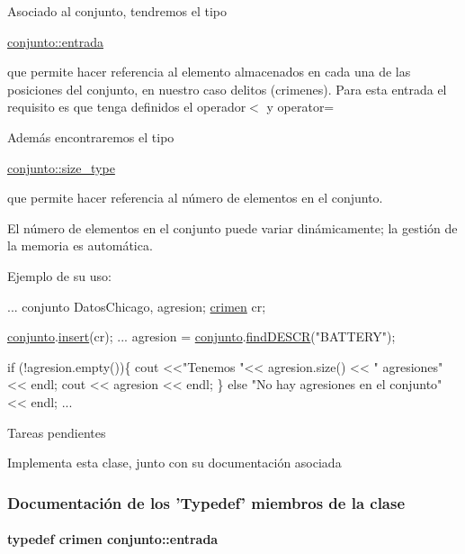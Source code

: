 Asociado al conjunto, tendremos el tipo
\begin{DoxyCode}
\hyperlink{classcrimen}{conjunto::entrada} 
\end{DoxyCode}
 que permite hacer referencia al elemento almacenados en cada una de las posiciones del conjunto, en nuestro caso delitos (crimenes). Para esta entrada el requisito es que tenga definidos el operador$<$ y operator=

Además encontraremos el tipo
\begin{DoxyCode}
\hyperlink{classconjunto_a855a5893bb0f5a851ab2dbf2b8aa6cc7}{conjunto::size\_type} 
\end{DoxyCode}
 que permite hacer referencia al número de elementos en el conjunto.

El número de elementos en el conjunto puede variar dinámicamente; la gestión de la memoria es automática.

Ejemplo de su uso\+: 
\begin{DoxyCode}
...
conjunto DatosChicago, agresion;
\hyperlink{classcrimen}{crimen} cr;

\hyperlink{classconjunto}{conjunto}.\hyperlink{classconjunto_aa65b9f7c4cb9bad6d4e40c1973095930}{insert}(cr);
...
agresion = \hyperlink{classconjunto}{conjunto}.\hyperlink{classconjunto_a5190c59db573008cc48a8ce734954a96}{findDESCR}(\textcolor{stringliteral}{"BATTERY"});

\textcolor{keywordflow}{if} (!agresion.empty())\{
 cout <<\textcolor{stringliteral}{"Tenemos "}<< agresion.size() << \textcolor{stringliteral}{" agresiones"} << endl;
 cout << agresion << endl;
\} \textcolor{keywordflow}{else} \textcolor{stringliteral}{"No hay agresiones en el conjunto"} << endl;
...
\end{DoxyCode}
 \begin{DoxyRefDesc}{Tareas pendientes}
\item[\hyperlink{todo__todo000003}{Tareas pendientes}]Implementa esta clase, junto con su documentación asociada \end{DoxyRefDesc}


\subsubsection{Documentación de los 'Typedef' miembros de la clase}
\hypertarget{classconjunto_a09cad766dd65de73e51eae21f9d22585}{
\paragraph[{entrada}]{\setlength{\rightskip}{0pt plus 5cm}typedef {\bf crimen} {\bf conjunto\+::entrada}}}\label{classconjunto_a09cad766dd65de73e51eae21f9d22585}



